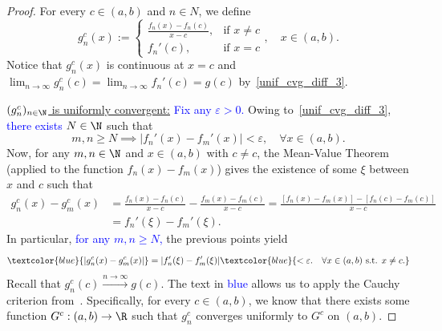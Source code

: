 \begin{proof}
	For every $c\in (a,b)$ and $n\in N$, we define
	\[
	g_n^c(x):= \left\{
	\begin{array}{cl}
		\frac{f_n(x)-f_n(c)}{x-c}, 	&\text{if }x\neq c 	\\
		f_n'(c), 	&\text{if }x=c
	\end{array}
	\right.,\quad x\in (a,b).
	\]
	Notice that $g_n^c(x)$ is continuous at $x=c$ and $\lim_{n\to\infty} g_n^c(c) = \lim_{n\to\infty}f_n'(c) = g(c)$ by~\ref{unif_cvg_diff_3}. 
	
	\ul{$(g_n^c)_{n\in\N}$ is uniformly convergent:} \textcolor{blue}{Fix any $\varepsilon>0$.} Owing to~\ref{unif_cvg_diff_3}, \textcolor{blue}{there exists $N\in \N$} such that
	\[
	m,n\ge N\implies |f_n'(x) - f_m'(x)|<\varepsilon,\quad \forall x\in (a,b).
	\]
	Now, for any $m,n\in\N$ and $x\in (a,b)$ with $c\neq c$, the Mean-Value Theorem (applied to the function $f_n(x) - f_m(x)$) gives the existence of some $\xi$ between $x$ and $c$ such that
	\begin{align*}
	g_n^c(x) - g_m^c(x) &= \frac{f_n(x)-f_n(c)}{x-c} - \frac{f_m(x)-f_m(c)}{x-c} = \frac{[f_n(x) - f_m(x)] - [f_n(c) - f_m(c)]}{x-c} 	\\
	&= f_n'(\xi) - f_m'(\xi).
	\end{align*}
	In particular, \textcolor{blue}{for any $m,n\ge N$,} the previous points yield
	\[
	\textcolor{blue}{|g_n^c(x) - g_m^c(x)|} = |f_n'(\xi) - f_m'(\xi)| \textcolor{blue}{< \varepsilon.\quad \forall x\in (a,b)\text{ s.t. }x\neq c.}
	\]
	Recall that $g_n^c(c) \overset{n\to \infty}{\to} g(c)$. The text in \textcolor{blue}{blue} allows us to apply the Cauchy criterion from~. Specifically, for every $c\in (a,b)$, we know that there exists some function $G^c:(a,b)\to \R$ such that $g_n^c$ converges uniformly to $G^c$ on $(a,b)$.
	

\end{proof}
